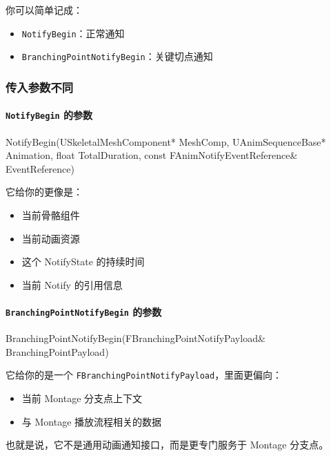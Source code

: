 你可以简单记成：

\begin{itemize}
	\item \verb|NotifyBegin|：正常通知
	\item \verb|BranchingPointNotifyBegin|：关键切点通知
\end{itemize}

\subsubsection{传入参数不同}

\paragraph{\texttt{NotifyBegin} 的参数}

\begin{code}
	NotifyBegin(USkeletalMeshComponent* MeshComp, UAnimSequenceBase* Animation, float TotalDuration, 	const FAnimNotifyEventReference& EventReference)
\end{code}

它给你的更像是：

\begin{itemize}
	\item 当前骨骼组件
	\item 当前动画资源
	\item 这个 NotifyState 的持续时间
	\item 当前 Notify 的引用信息
\end{itemize}

\paragraph{\texttt{BranchingPointNotifyBegin} 的参数}

\begin{code}
	BranchingPointNotifyBegin(FBranchingPointNotifyPayload& BranchingPointPayload)
\end{code}

它给你的是一个 \verb|FBranchingPointNotifyPayload|，里面更偏向：

\begin{itemize}
	\item 当前 Montage 分支点上下文
	\item 与 Montage 播放流程相关的数据
\end{itemize}

也就是说，它不是通用动画通知接口，而是更专门服务于 Montage 分支点。

